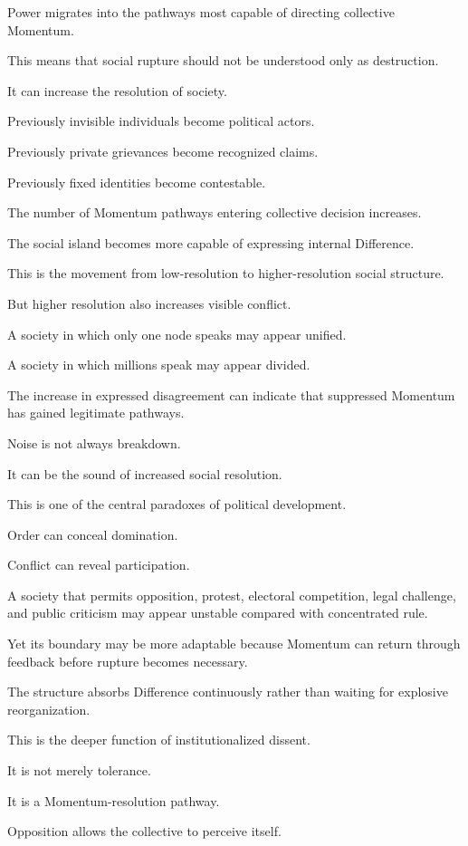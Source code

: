 Power migrates into the pathways most capable of directing collective Momentum.

This means that social rupture should not be understood only as destruction.

It can increase the resolution of society.

Previously invisible individuals become political actors.

Previously private grievances become recognized claims.

Previously fixed identities become contestable.

The number of Momentum pathways entering collective decision increases.

The social island becomes more capable of expressing internal Difference.

This is the movement from low-resolution to higher-resolution social structure.

But higher resolution also increases visible conflict.

A society in which only one node speaks may appear unified.

A society in which millions speak may appear divided.

The increase in expressed disagreement can indicate that suppressed Momentum has gained legitimate pathways.

Noise is not always breakdown.

It can be the sound of increased social resolution.

This is one of the central paradoxes of political development.

Order can conceal domination.

Conflict can reveal participation.

A society that permits opposition, protest, electoral competition, legal challenge, and public criticism may appear unstable compared with concentrated rule.

Yet its boundary may be more adaptable because Momentum can return through feedback before rupture becomes necessary.

The structure absorbs Difference continuously rather than waiting for explosive reorganization.

This is the deeper function of institutionalized dissent.

It is not merely tolerance.

It is a Momentum-resolution pathway.

Opposition allows the collective to perceive itself.


